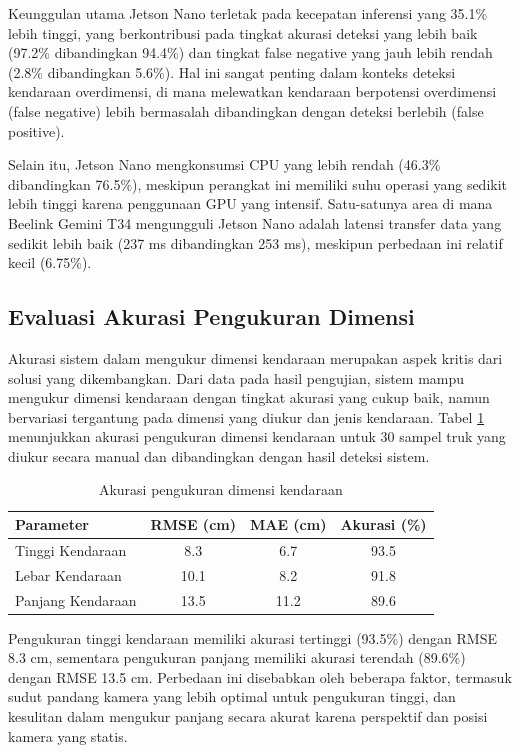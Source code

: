 Keunggulan utama Jetson Nano terletak pada kecepatan inferensi yang 35.1\% lebih tinggi, yang berkontribusi pada tingkat akurasi deteksi yang lebih baik (97.2\% dibandingkan 94.4\%) dan tingkat false negative yang jauh lebih rendah (2.8\% dibandingkan 5.6\%). Hal ini sangat penting dalam konteks deteksi kendaraan overdimensi, di mana melewatkan kendaraan berpotensi overdimensi (false negative) lebih bermasalah dibandingkan dengan deteksi berlebih (false positive).

Selain itu, Jetson Nano mengkonsumsi CPU yang lebih rendah (46.3\% dibandingkan 76.5\%), meskipun perangkat ini memiliki suhu operasi yang sedikit lebih tinggi karena penggunaan GPU yang intensif. Satu-satunya area di mana Beelink Gemini T34 mengungguli Jetson Nano adalah latensi transfer data yang sedikit lebih baik (237 ms dibandingkan 253 ms), meskipun perbedaan ini relatif kecil (6.75\%).

\subsection{Evaluasi Akurasi Pengukuran Dimensi}

Akurasi sistem dalam mengukur dimensi kendaraan merupakan aspek kritis dari solusi yang dikembangkan. Dari data pada hasil pengujian, sistem mampu mengukur dimensi kendaraan dengan tingkat akurasi yang cukup baik, namun bervariasi tergantung pada dimensi yang diukur dan jenis kendaraan. Tabel \ref{tab:dimension_accuracy} menunjukkan akurasi pengukuran dimensi kendaraan untuk 30 sampel truk yang diukur secara manual dan dibandingkan dengan hasil deteksi sistem.

\begin{table}[htbp]
  \centering
  \begin{tabular}{|l|c|c|c|}
  \hline
  \rowcolor[HTML]{C0C0C0}
  \textbf{Parameter} & \textbf{RMSE (cm)} & \textbf{MAE (cm)} & \textbf{Akurasi (\%)} \\
  \hline
  Tinggi Kendaraan & 8.3 & 6.7 & 93.5 \\
  \hline
  Lebar Kendaraan & 10.1 & 8.2 & 91.8 \\
  \hline
  Panjang Kendaraan & 13.5 & 11.2 & 89.6 \\
  \hline
  \end{tabular}
  \caption{Akurasi pengukuran dimensi kendaraan}
  \label{tab:dimension_accuracy}
\end{table}

Pengukuran tinggi kendaraan memiliki akurasi tertinggi (93.5\%) dengan RMSE 8.3 cm, sementara pengukuran panjang memiliki akurasi terendah (89.6\%) dengan RMSE 13.5 cm. Perbedaan ini disebabkan oleh beberapa faktor, termasuk sudut pandang kamera yang lebih optimal untuk pengukuran tinggi, dan kesulitan dalam mengukur panjang secara akurat karena perspektif dan posisi kamera yang statis.

